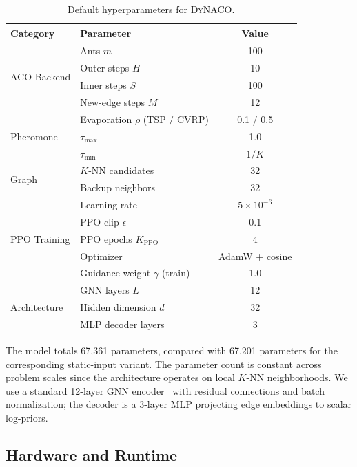\documentclass[sigconf]{acmart}
\newcommand{\DyNACO}{\textsc{DyNACO}}
\begin{document}
\begin{table}[h]
\centering
\caption{Default hyperparameters for \DyNACO{}.}
\label{tab:hyperparams}
\small
\begin{tabular}{llc}
\toprule
Category & Parameter & Value \\
\midrule
\multirow{4}{*}{ACO Backend}
    & Ants $m$ & 100 \\
    & Outer steps $H$ & 10 \\
    & Inner steps $S$ & 100 \\
    & New-edge steps $M$ & 12 \\
\midrule
\multirow{3}{*}{Pheromone}
    & Evaporation $\rho$ (TSP / CVRP) & 0.1 / 0.5 \\
    & $\tau_{\max}$ & 1.0 \\
    & $\tau_{\min}$ & $1/K$ \\
\midrule
\multirow{2}{*}{Graph}
    & $K$-NN candidates & 32 \\
    & Backup neighbors & 32 \\
\midrule
\multirow{5}{*}{PPO Training}
    & Learning rate & $5 \times 10^{-6}$ \\
    & PPO clip $\epsilon$ & 0.1 \\
    & PPO epochs $K_{\text{PPO}}$ & 4 \\
    & Optimizer & AdamW + cosine \\
    & Guidance weight $\gamma$ (train) & 1.0 \\
\midrule
\multirow{3}{*}{Architecture}
    & GNN layers $L$ & 12 \\
    & Hidden dimension $d$ & 32 \\
    & MLP decoder layers & 3 \\
\bottomrule
\end{tabular}
\end{table}

The model totals 67,361 parameters, compared with 67,201 parameters for the corresponding static-input variant. The parameter count is constant across problem scales since the architecture operates on local $K$-NN neighborhoods.
We use a standard 12-layer GNN encoder~\cite{deepaco} with residual connections and batch normalization; the decoder is a 3-layer MLP projecting edge embeddings to scalar log-priors.

\subsection{Hardware and Runtime}
\label{app:hardware}
\end{document}
